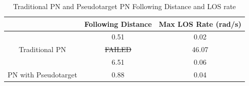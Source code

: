 \documentclass[conference]{IEEEtran}
\providecommand{\DIFdel}[1]{{\protect\color{red}\sout{#1}}}                      %
\providecommand{\DIFdelbegin}{} %
\providecommand{\DIFdelend}{} %
\providecommand{\DIFdelFL}[1]{\DIFdel{#1}} %
\providecommand{\DIFdelbeginFL}{} %
\providecommand{\DIFdelendFL}{} %
\newcommand{\DIFscaledelfig}{0.5}
\newlength{\DIFdelgraphicswidth} %
\newlength{\DIFdelgraphicsheight} %
\newcommand{\DIFdelincludegraphics}[2][]{%
\sbox{\DIFdelgraphicsbox}{\DIFOincludegraphics[#1]{#2}}%
\settoboxwidth{\DIFdelgraphicswidth}{\DIFdelgraphicsbox} %
\settoboxtotalheight{\DIFdelgraphicsheight}{\DIFdelgraphicsbox} %
\scalebox{\DIFscaledelfig}{%
\parbox[b]{\DIFdelgraphicswidth}{\usebox{\DIFdelgraphicsbox}\\[-\baselineskip] \rule{\DIFdelgraphicswidth}{0em}}\llap{\resizebox{\DIFdelgraphicswidth}{\DIFdelgraphicsheight}{%
\setlength{\unitlength}{\DIFdelgraphicswidth}%
\begin{picture}(1,1)%
\thicklines\linethickness{2pt} %
{\color[rgb]{1,0,0}\put(0,0){\framebox(1,1){}}}%
{\color[rgb]{1,0,0}\put(0,0){\line( 1,1){1}}}%
{\color[rgb]{1,0,0}\put(0,1){\line(1,-1){1}}}%
\end{picture}%
}\hspace*{3pt}}} %
} %
\DeclareRobustCommand{\DIFdelbegin}{\DIFOdelbegin \let\includegraphics\DIFdelincludegraphics} %
\DeclareRobustCommand{\DIFdelend}{\DIFOaddend \let\includegraphics\DIFOincludegraphics} %
\DeclareRobustCommand{\DIFdelbeginFL}{\DIFOdelbeginFL \let\includegraphics\DIFdelincludegraphics} %
\DeclareRobustCommand{\DIFdelendFL}{\DIFOaddendFL \let\includegraphics\DIFOincludegraphics} %
\begin{document}
\DIFdelbegin %

\DIFdelend \begin{table}[H]
	\centering
	\caption{Traditional PN and Pseudotarget PN Following Distance and LOS rate}
	\label{my-label}
	\begin{tabular}{c|c|c|}
		\cline{2-3}
		\multicolumn{1}{l|}{}                                        & \multicolumn{1}{l|}{Following Distance} & \multicolumn{1}{l|}{Max LOS Rate (rad/s)} \\ \hline
		\multicolumn{1}{|c|}{}                                       & 0.51                                    & 0.02                                      \\ \cline{2-3} 
		\multicolumn{1}{|c|}{\multirow{-2}{*}{Traditional PN}}       & \cellcolor[HTML]{C0C0C0}                \DIFdelbeginFL \DIFdelFL{FAILED         }\DIFdelendFL & 46.07                                     \\ \hline
		\multicolumn{1}{|c|}{}                                       & 6.51                                    & 0.06                                      \\ \cline{2-3} 
		\multicolumn{1}{|c|}{\multirow{-2}{*}{PN with Pseudotarget}} & 0.88                                    & 0.04                                      \\ \hline
	\end{tabular}
\end{table}
\end{document}
